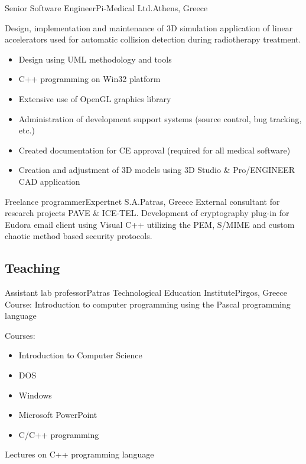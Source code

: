 \documentclass[10pt,a4paper]{moderncv}        %
\begin{document}
  {Senior Software Engineer}{Pi-Medical Ltd.}{Athens, Greece}{}
  {Design, implementation and maintenance of 3D simulation application of linear accelerators 
  used for automatic collision detection during radiotherapy treatment.{}%
\begin{itemize}%
  \item Design using UML methodology and tools
  \item C++ programming on Win32 platform
  \item Extensive use of OpenGL graphics library
  \item Administration of development support systems (source control, bug tracking, etc.)
  \item Created documentation for CE approval (required for all medical software)
  \item Creation and adjustment of 3D models using 3D Studio \& Pro/ENGINEER CAD application
\end{itemize}}

{Freelance programmer}{Expertnet S.A.}{Patras, Greece}{}
{External consultant for research projects PAVE \& ICE-TEL.\newline{}
Development of cryptography plug-in for Eudora email client 
using Visual C++ utilizing the PEM, S/MIME and custom chaotic method based security protocols.
}


\subsection{Teaching}

  {Assistant lab professor}{Patras Technological Education Institute}{Pirgos, Greece}{}
{Course: Introduction to computer programming using the Pascal programming language}

{Courses:
\begin{itemize}%
  \item Introduction to Computer Science
  \item DOS
  \item Windows
  \item Microsoft PowerPoint
  \item C/C++ programming
\end{itemize}}

{Lectures on C++ programming language}
\end{document}
